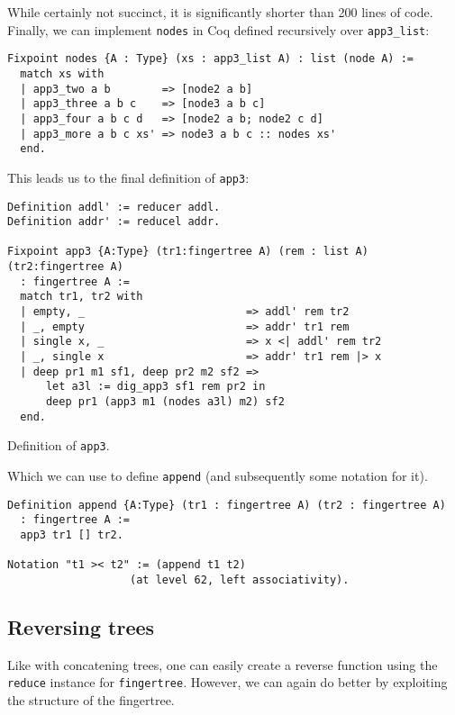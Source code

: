 \documentclass{article}
\newcommand{\code}[1]{\texttt{#1}}
\begin{document}
While certainly not succinct, it is significantly shorter than 200 lines of
code. Finally, we can implement \code{nodes} in Coq defined recursively
over \code{app3\_list}:

\begin{listing}[H]
\begin{verbatim}
Fixpoint nodes {A : Type} (xs : app3_list A) : list (node A) :=
  match xs with
  | app3_two a b        => [node2 a b]
  | app3_three a b c    => [node3 a b c]
  | app3_four a b c d   => [node2 a b; node2 c d]
  | app3_more a b c xs' => node3 a b c :: nodes xs'
  end.
\end{verbatim}
\end{listing}

This leads us to the final definition of \code{app3}:

\begin{listing}[H]
\begin{verbatim}
Definition addl' := reducer addl.
Definition addr' := reducel addr.

Fixpoint app3 {A:Type} (tr1:fingertree A) (rem : list A) (tr2:fingertree A)
  : fingertree A :=
  match tr1, tr2 with
  | empty, _                         => addl' rem tr2
  | _, empty                         => addr' tr1 rem
  | single x, _                      => x <| addl' rem tr2
  | _, single x                      => addr' tr1 rem |> x
  | deep pr1 m1 sf1, deep pr2 m2 sf2 =>
      let a3l := dig_app3 sf1 rem pr2 in
      deep pr1 (app3 m1 (nodes a3l) m2) sf2
  end.
\end{verbatim}
\caption{Definition of \code{app3}.}
\label{app3}
\end{listing}

Which we can use to define \code{append} (and subsequently some notation
for it).

\begin{listing}[H]
\begin{verbatim}
Definition append {A:Type} (tr1 : fingertree A) (tr2 : fingertree A)
  : fingertree A :=
  app3 tr1 [] tr2.

Notation "t1 >< t2" := (append t1 t2)
                   (at level 62, left associativity).
\end{verbatim}
\end{listing}

\subsection{Reversing trees}
Like with concatening trees, one can easily create a reverse
function using the \code{reduce} instance for \code{fingertree}. However,
we can again do better by exploiting the structure of the fingertree.
\end{document}
